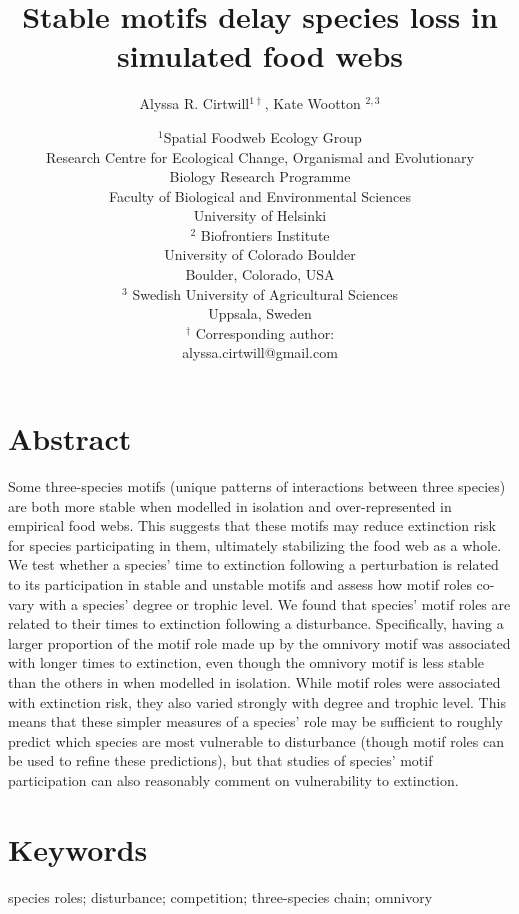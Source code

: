 \documentclass[12pt]{article}
\title{Stable motifs delay species loss in simulated food webs}
\author{Alyssa R. Cirtwill$^{1\dagger}$, Kate Wootton $^{2,3}$}
\date{\small$^1$Spatial Foodweb Ecology Group\\
Research Centre for Ecological Change, Organismal and Evolutionary\\
Biology Research Programme\\
Faculty of Biological and Environmental
Sciences\\
University of Helsinki\\
\medskip
\small$^2$ Biofrontiers Institute\\
University of Colorado Boulder\\
Boulder, Colorado, USA\\
\medskip
\small$^3$ Swedish University of Agricultural Sciences\\
Uppsala, Sweden\\
\medskip
$^\dagger$ Corresponding author:\\
alyssa.cirtwill@gmail.com\\
 }
\begin{document}
 
\maketitle 
\raggedright
\setlength{\parindent}{15pt} 

\clearpage
\begin{spacing}{1.0}

\section*{Abstract} %
    Some three-species motifs (unique patterns of interactions between three species) are both more stable when modelled in isolation and over-represented in empirical food webs. This suggests that these motifs may reduce extinction risk for species participating in them, ultimately stabilizing the food web as a whole. 
    We test whether a species' time to extinction following a perturbation is related to its participation in stable and unstable motifs and assess how motif roles co-vary with a species' degree or trophic level.
    We found that species' motif roles are related to their times to extinction following a disturbance. Specifically, having a larger proportion of the motif role made up by the omnivory motif was associated with longer times to extinction, even though the omnivory motif is less stable than the others in when modelled in isolation.
    While motif roles were associated with extinction risk, they also varied strongly with degree and trophic level. This means that these simpler measures of a species' role may be sufficient to roughly predict which species are most vulnerable to disturbance (though motif roles can be used to refine these predictions), but that studies of species' motif participation can also reasonably comment on vulnerability to extinction. 

\section*{Keywords}

	species roles; disturbance; competition; three-species chain; omnivory


\end{spacing}
\end{document}
